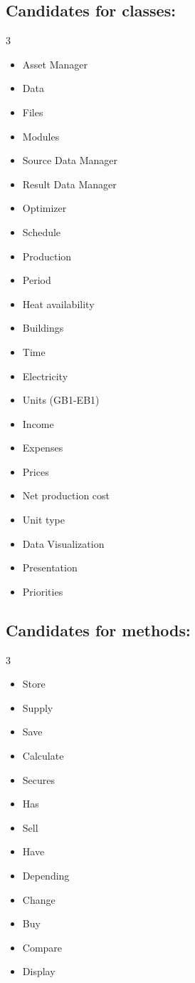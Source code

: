 \subsection*{\textcolor{nounred}{Candidates for classes:}}
\begin{multicols}{3} %
\begin{itemize}
    \item Asset Manager
    \item Data
    \item Files
    \item Modules
    \item Source Data Manager
    \item Result Data Manager
    \item Optimizer
    \item Schedule
    \item Production
    \item Period
    \item Heat availability
    \item Buildings
    \item Time
    \item Electricity
    \item Units (GB1-EB1)
    \item Income
    \item Expenses
    \item Prices
    \item Net production cost
    \item Unit type
    \item Data Visualization
    \item Presentation
    \item Priorities
\end{itemize}
\end{multicols}

\vspace{2em}

\subsection*{\textcolor{verbblue}{Candidates for methods:}}
\begin{multicols}{3}
\begin{itemize}
    \item Store
    \item Supply
    \item Save
    \item Calculate
    \item Secures
    \item Has
    \item Sell
    \item Have
    \item Depending
    \item Change
    \item Buy
    \item Compare
    \item Display
\end{itemize}
\end{multicols}

